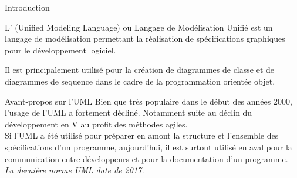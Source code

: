 \begin{frame}{Introduction}

    L' (Unified Modeling Language) ou Langage de Modélisation Unifié est un langage de modélisation permettant la réalisation de spécifications graphiques pour le développement logiciel.

    Il est principalement utilisé pour la création de diagrammes de classe et de diagrammes de sequence dans le cadre de la programmation orientée objet.    

\end{frame}

\begin{frame}{Avant-propos sur l'UML}
    Bien que très populaire dans le début des années 2000, l'usage de l'UML a fortement décliné. Notamment suite au déclin du développement en V au profit des méthodes agiles.\\

    Si l'UML a été utilisé pour préparer en amont la structure et l'ensemble des spécifications d'un programme, aujourd'hui, il est surtout utilisé en aval pour la communication entre développeurs et pour la documentation d'un programme.\\

    \textit{La dernière norme UML date de 2017.}

\end{frame}

